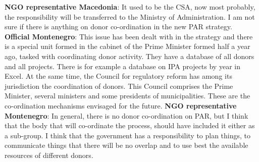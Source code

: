 \textbf{NGO representative Macedonia}: It used to be the CSA, now most probably, the responsibility will be transferred to the Ministry of Administration. I am not sure if there is anything on donor co-ordination in the new PAR strategy.
\textbf{Official Montenegro}: This issue has been dealt with in the strategy and there is a special unit formed in the cabinet of the Prime Minister formed half a year ago, tasked with coordinating donor activity. They have a database of all donors and all projects. There is for example a database on IPA projects by year in Excel. At the same time, the Council for regulatory reform has among its jurisdiction the coordination of donors. This Council comprises the Prime Minister, several ministers and some presidents of municipalities. These are the co-ordination mechanisms envisaged for the future. 
\textbf{NGO representative Montenegro}: In general, there is no donor co-ordination on PAR, but I think that the body that will co-ordinate the process, should have included it either as a sub-group. I think that the government has a responsibility to plan things, to communicate things that there will be no overlap and to use best the available resources of different donors.%
